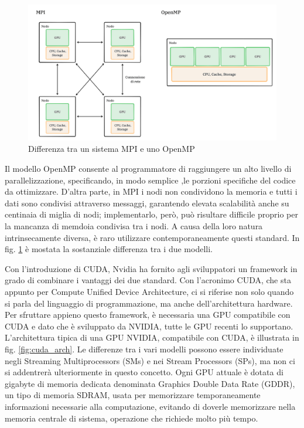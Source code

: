 \begin{figure}[ht]
    \centering
    \includegraphics[width=.9\linewidth]{images/chapter2/mpi_openmp.png}
    \caption{Differenza tra un sistema MPI e uno OpenMP}
    \label{fig:mpi_openmp}
\end{figure}

Il modello OpenMP consente al programmatore di raggiungere un alto livello di parallelizzazione, specificando, in modo semplice ,le porzioni specifiche del codice da ottimizzare. D'altra parte, in MPI i nodi non condividono la memoria e tutti i dati sono condivisi attraverso messaggi, garantendo elevata scalabilità anche su centinaia di miglia di nodi; implementarlo, però,  può risultare difficile proprio per la mancanza di memdoia condivisa tra i nodi. A causa della loro natura intrinsecamente diversa, è raro utilizzare contemporaneamente questi standard. In fig. \ref*{fig:mpi_openmp} è mostata la sostanziale differenza tra i due modelli.


Con l'introduzione di CUDA, Nvidia ha fornito agli sviluppatori un framework in grado di combinare i vantaggi dei due standard. Con l'acronimo CUDA, che sta appunto per Compute Unified Device Architecture, ci si riferise non solo quando si parla del linguaggio di programmazione, ma anche dell'architettura hardware. Per sfruttare appieno questo framework, è necessaria una GPU compatibile con CUDA e dato che è sviluppato da NVIDIA, tutte le GPU recenti lo supportano. L'architettura tipica di una GPU NVIDIA, compatibile con CUDA, è illustrata in fig. \ref{fig:cuda_arch}. Le differenze tra i vari modelli possono essere individuate negli Streaming Multiprocessors (SMs) e nei Stream Processors (SPs), ma non ci si addentrerà ulteriormente in questo concetto. Ogni GPU attuale è dotata di gigabyte di memoria dedicata denominata Graphics Double Data Rate (GDDR), un tipo di memoria SDRAM, usata per memorizzare temporaneamente informazioni necessarie alla computazione, evitando di doverle memorizzare nella memoria centrale di sistema, operazione che richiede molto più tempo.


